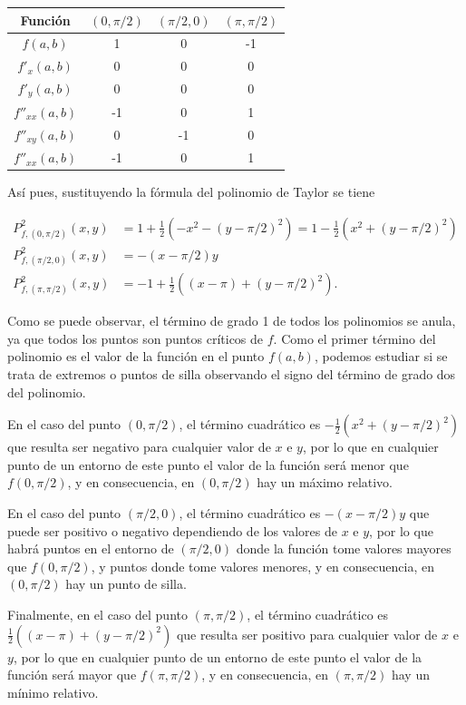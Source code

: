 \documentclass[
  spanish,
  a4paper,
]{scrreport}
\newcounter{none} %
\theoremstyle{definition}
\theoremstyle{remark}
\begin{document}
\begin{tcolorbox}
{\def\LTcaptype{none} %
\begin{longtable}[]{@{}cccc@{}}
\toprule\noalign{}
Función & \((0,\pi/2)\) & \((\pi/2,0)\) & \((\pi,\pi/2)\) \\
\midrule\noalign{}
\endhead
\bottomrule\noalign{}
\endlastfoot
\(f(a,b)\) & 1 & 0 & -1 \\
\(f'_x(a,b)\) & 0 & 0 & 0 \\
\(f'_y(a,b)\) & 0 & 0 & 0 \\
\(f''_{xx}(a,b)\) & -1 & 0 & 1 \\
\(f''_{xy}(a,b)\) & 0 & -1 & 0 \\
\(f''_{xx}(a,b)\) & -1 & 0 & 1 \\
\end{longtable}
}

Así pues, sustituyendo la fórmula del polinomio de Taylor se tiene

\begin{align*}
P^2_{f,(0,\pi/2)}(x,y) 
&= 1 + \frac{1}{2}(-x^2 - (y-\pi/2)^2) = 1 - \frac{1}{2}(x^2 + (y-\pi/2)^2) \\
P^2_{f,(\pi/2, 0)}(x,y) 
&= -(x-\pi/2)y \\
P^2_{f,(\pi,\pi/2)}(x,y) 
&= -1 + \frac{1}{2}((x-\pi) + (y-\pi/2)^2).
\end{align*}

Como se puede observar, el término de grado 1 de todos los polinomios se
anula, ya que todos los puntos son puntos críticos de \(f\). Como el
primer término del polinomio es el valor de la función en el punto
\(f(a,b)\), podemos estudiar si se trata de extremos o puntos de silla
observando el signo del término de grado dos del polinomio.

En el caso del punto \((0,\pi/2)\), el término cuadrático es
\(- \frac{1}{2}(x^2 + (y-\pi/2)^2)\) que resulta ser negativo para
cualquier valor de \(x\) e \(y\), por lo que en cualquier punto de un
entorno de este punto el valor de la función será menor que
\(f(0,\pi/2)\), y en consecuencia, en \((0,\pi/2)\) hay un máximo
relativo.

En el caso del punto \((\pi/2,0)\), el término cuadrático es
\(-(x-\pi/2)y\) que puede ser positivo o negativo dependiendo de los
valores de \(x\) e \(y\), por lo que habrá puntos en el entorno de
\((\pi/2,0)\) donde la función tome valores mayores que \(f(0,\pi/2)\),
y puntos donde tome valores menores, y en consecuencia, en \((0,\pi/2)\)
hay un punto de silla.

Finalmente, en el caso del punto \((\pi,\pi/2)\), el término cuadrático
es \(\frac{1}{2}((x-\pi) + (y-\pi/2)^2)\) que resulta ser positivo para
cualquier valor de \(x\) e \(y\), por lo que en cualquier punto de un
entorno de este punto el valor de la función será mayor que
\(f(\pi,\pi/2)\), y en consecuencia, en \((\pi,\pi/2)\) hay un mínimo
relativo.

\end{tcolorbox}
\end{document}

